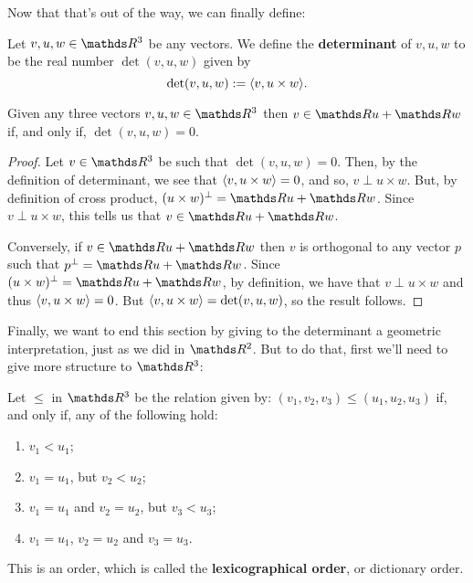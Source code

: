 Now that that's out of the way, we can finally define:

\begin{df}
	Let $v,u,w\in \R^3$ be any vectors. We define the \textbf{determinant} of $v,u,w$ to be the real number $\det(v,u,w)$ given by
	\[\det(v,u,w):=\langle v,u\times w\rangle.\]
\end{df}

\begin{lemma}
	Given any three vectors $v,u,w\in \R^3$ then $v\in\R u+\R w$ if, and only if, $\det(v,u,w)=0$.
\end{lemma}
\begin{proof}
	Let $v\in \R^3$ be such that $\det(v,u,w)=0$. Then, by the definition of determinant, we see that $\langle v,u\times w\rangle=0$, and so, $v\perp u\times w$. But, by definition of cross product, $(u\times w)^\perp=\R u+\R w$. Since $v\perp u\times w$, this tells us that $v\in \R u+\R w$.
	
	Conversely, if $v\in \R u+\R w$ then $v$ is orthogonal to any vector $p$ such that $p^\perp=\R u+\R w$. Since $(u\times w)^\perp=\R u+\R w$, by definition, we have that $v\perp u\times w$ and thus $\langle v,u\times w\rangle=0$. But $\langle v,u\times w\rangle=\det(v,u,w)$, so the result follows.
\end{proof}

Finally, we want to end this section by giving to the determinant a geometric interpretation, just as we did in $\R^2$. But to do that, first we'll need to give more structure to $\R^3$:

\begin{df}
	Let $\leq$ in $\R^3$ be the relation given by: $(v_1,v_2,v_3)\leq (u_1,u_2,u_3)$ if, and only if, any of the following hold:
	\begin{enumerate}[(1)]		
		\item $v_1< u_1$;
		\item $v_1=u_1$, but $v_2< u_2$;
		\item $v_1=u_1$ and $v_2=u_2$, but $v_3< u_3$;
		\item $v_1=u_1$, $v_2=u_2$ and $v_3=u_3$.
	\end{enumerate}

	This is an order, which is called the \textbf{lexicographical order}, or dictionary order.
\end{df}

